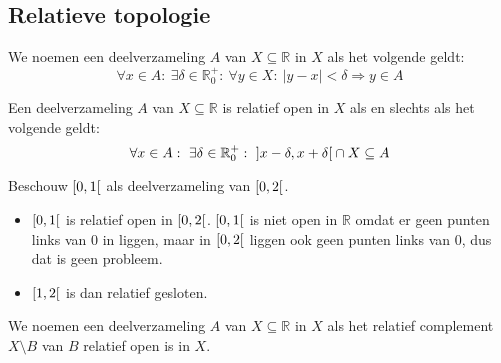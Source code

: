 \documentclass[main.tex]{subfiles}
\begin{document}
\subsection{Relatieve topologie}
\label{sec:relatieve-topologie}

\begin{de}
  We noemen een deelverzameling $A$ van $X\subseteq \mathbb{R}$  in $X$ als het volgende geldt:
  \[ \forall x\in A:\ \exists \delta \in \mathbb{R}_{0}^{+}:\ \forall y\in X:\ |y-x| < \delta \Rightarrow y \in A \]
\end{de}

\begin{st}
  Een  deelverzameling $A$ van $X\subseteq \mathbb{R}$  is relatief open in $X$ als en slechts als het volgende geldt:
  \[ \forall x\in A:\ \exists \delta\in \mathbb{R}_{0}^{+}:\ \interval[open]{x-\delta}{x+\delta} \cap X \subseteq A \]
\end{st}

\begin{vb}
  Beschouw $\interval[open right]{0}{1}$ als deelverzameling van $\interval[open right]{0}{2}$.
  \begin{itemize}
  \item $\interval[open right]{0}{1}$ is relatief open in $\interval[open right]{0}{2}$.
    $\interval[open right]{0}{1}$ is niet open in $\mathbb{R}$ omdat er geen punten links van $0$ in liggen, maar in $\interval[open right]{0}{2}$ liggen ook geen punten links van $0$, dus dat is geen probleem.
  \item $\interval[open right]{1}{2}$ is dan relatief gesloten.
  \end{itemize}
\end{vb}

\begin{de}
  We noemen een deelverzameling $A$ van $X\subseteq \mathbb{R}$  in $X$ als het relatief complement $X\setminus B$ van $B$ relatief open is in $X$.
\end{de}
\end{document}
